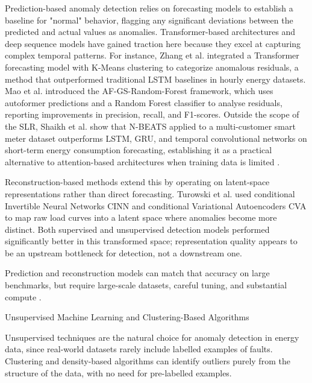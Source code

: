 ﻿\documentclass[12pt,reqno, twoside]{amsbook}
\makeatletter
\numberwithin{figure}{chapter}
\numberwithin{table}{chapter}
\numberwithin{equation}{chapter}
\def\subsection{\@startsection{subsection}{2}%
      \z@{.5\linespacing\@plus.7\linespacing}{.25\linespacing}%
      {\normalfont\bfseries\flushleft}}
\theoremstyle{plain}
\numberwithin{equation}{chapter}
\numberwithin{section}{chapter}
\makeatother
\begin{document}
Prediction-based anomaly detection relies on forecasting models to establish a baseline for "normal" behavior, flagging any significant deviations between the predicted and actual values as anomalies. Transformer-based architectures and deep sequence models have gained traction here because they excel at capturing complex temporal patterns. For instance, Zhang et al. \cite{zhang_power_2021} integrated a Transformer forecasting model with K-Means clustering to categorize anomalous residuals, a method that outperformed traditional \ac{LSTM} baselines in hourly energy datasets. Mao et al. \cite{mao_research_2024} introduced the AF-GS-Random-Forest framework, which uses autoformer predictions and a Random Forest classifier to analyse residuals, reporting improvements in precision, recall, and F1-scores. Outside the scope of the SLR, Shaikh et al. show that N-BEATS applied to a multi-customer smart meter dataset outperforms \ac{LSTM}, GRU, and temporal convolutional networks on short-term energy consumption forecasting, establishing it as a practical alternative to attention-based architectures when training data is limited \cite{shaikh_nbeats_energy_2022}.

Reconstruction-based methods extend this by operating on latent-space representations rather than direct forecasting. Turowski et al. \cite{turowski_enhancing_2022} used conditional Invertible Neural Networks \ac{CINN} and conditional Variational Autoencoders \ac{CVA} to map raw load curves into a latent space where anomalies become more distinct. Both supervised and unsupervised detection models performed significantly better in this transformed space; representation quality appears to be an upstream bottleneck for detection, not a downstream one.

Prediction and reconstruction models can match that accuracy on large benchmarks, but require large-scale datasets, careful tuning, and substantial compute \cite{himeur_artificial_2021}.

\subsection{Unsupervised Machine Learning and Clustering-Based Algorithms}

Unsupervised techniques are the natural choice for anomaly detection in energy data, since real-world datasets rarely include labelled examples of faults. Clustering and density-based algorithms can identify outliers purely from the structure of the data, with no need for pre-labelled examples.
\end{document}
